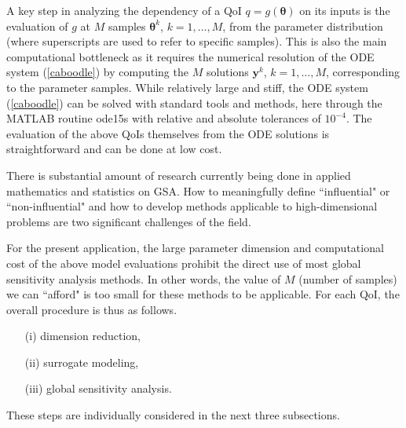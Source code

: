 
A key  step in analyzing the dependency of a QoI $q = g(\boldsymbol{\theta})$ on its inputs is the evaluation of $g$ at $M$ samples $\boldsymbol\theta^k$, $k=1,\dots, M$, from the parameter distribution (where superscripts are used to refer to specific samples). 
This is also the  main  computational bottleneck as it requires the numerical resolution of  the ODE system (\ref{caboodle})  by computing the $M$ solutions $\mathbf y^k$, $k=1,\dots , M$, corresponding to  the parameter samples. 
While relatively large and stiff, the ODE system (\ref{caboodle}) can be  solved with standard tools and methods, here through the MATLAB routine ode15s  with relative and absolute tolerances of $10^{-4}$. The evaluation of the above QoIs themselves from the ODE solutions is straightforward and can be done at low cost.

There is substantial amount of research currently being done in applied mathematics and statistics on GSA. How to meaningfully define ``influential" or ``non-influential" and  how to develop methods applicable to high-dimensional problems are two significant challenges of the field. 



For the present application, the large parameter dimension and computational cost of the above model evaluations prohibit the direct use of most global sensitivity analysis methods. In other words, the value of $M$ (number of samples)  we can ``afford" is too small for these methods to be applicable. 
For each QoI, the overall procedure is thus as follows. 

\begin{enumerate}
\item[(i)] dimension reduction,
\item[(ii)] surrogate modeling,
\item[(iii)] global sensitivity analysis.
\end{enumerate}

These steps are individually considered in the next three subsections. 




